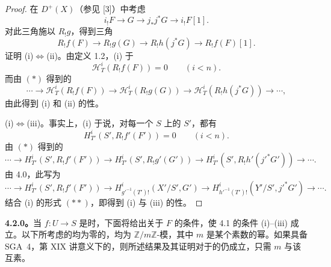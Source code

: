 \begin{proof}
在 $D^+(X)$（参见 [3]）中考虑
\[
i_!F\longrightarrow G\longrightarrow j_*j^*G\longrightarrow i_!F[1].
\]
对此三角施以 $R_!g$，得到三角
\[
R_!f(F)\longrightarrow R_!g(G)\longrightarrow R_!h(j^*G)
\longrightarrow R_!f(F)[1].\tag{*}
\]
证明 (i)$\Leftrightarrow$(ii)。由定义 1.2，(i) 于
\[
\mathcal H^i_T(R_!f(F))=0\qquad(i<n).
\]
而由 $(*)$ 得到的
\[
\cdots\longrightarrow\mathcal H^i_T(R_!f(F))\longrightarrow
\mathcal H^i_T(R_!g(G))\longrightarrow\mathcal H^i_T(R_!h(j^*G))\longrightarrow\cdots,
\]
由此得到 (i) 和 (ii) 的性。

(i)$\Leftrightarrow$(iii)。事实上，(i) 于说，对每一个 $S$ 上的 $S'$，都有
\[
H^i_{T'}(S',R_!f'(F'))=0\qquad(i<n).\tag{**}
\]
由 $(*)$ 得到的
\[
\cdots\longrightarrow H^i_{T'}(S',R_!f'(F'))\longrightarrow
H^i_{T'}(S',R_!g'(G'))\longrightarrow H^i_{T'}(S',R_!h'(j'^*G'))\longrightarrow\cdots.
\]
由 4.0，此写为
\[
\cdots\longrightarrow H^i_{T'}(S',R_!f'(F'))\longrightarrow
H^i_{g'^{-1}(T')!}(X'/S',G')\longrightarrow
H^i_{h'^{-1}(T')!}(Y'/S',j'^*G')\longrightarrow\cdots.
\]
结合 (i) 的形式 $(**)$，即得到 (i) 与 (iii) 的性。
\end{proof}

\textbf{4.2.0。}当 $f:U\to S$ 是时，下面将给出关于 $F$ 的条件，使 4.1 的条件 (i)--(iii) 成立。以下所考虑的均为零的，均为 $\mathbb Z/m\mathbb Z$-模，其中 $m$ 是某个素数的幂。如果具备 SGA~4，第 XIX 讲意义下的，则所述结果及其证明对于的仍成立，只需 $m$ 与该互素。

